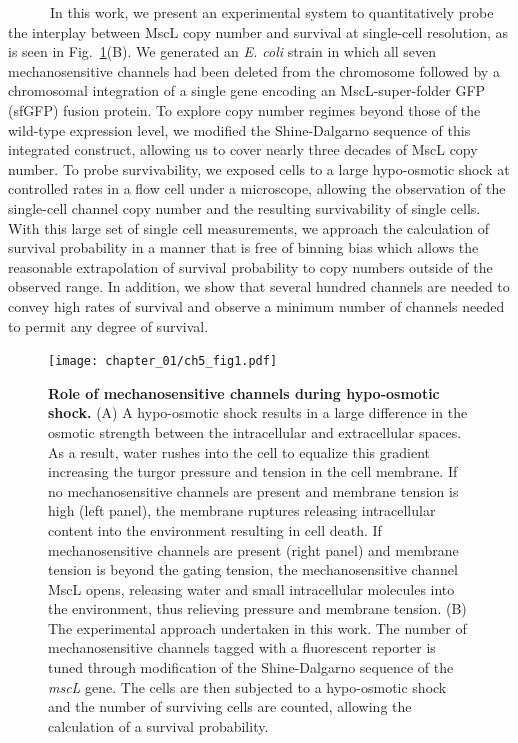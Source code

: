 \documentclass[12pt]{caltech_thesis}
\begin{document}
~ ~ ~ ~In this work, we present an experimental system to quantitatively
probe the interplay between MscL copy number and survival at single-cell
resolution, as is seen in Fig.~\ref{fig:overview}(B). We generated an
\emph{E. coli} strain in which all seven mechanosensitive channels had
been deleted from the chromosome followed by a chromosomal integration
of a single gene encoding an MscL-super-folder GFP (sfGFP) fusion
protein. To explore copy number regimes beyond those of the wild-type
expression level, we modified the Shine-Dalgarno sequence of this
integrated construct, allowing us to cover nearly three decades of MscL
copy number. To probe survivability, we exposed cells to a large
hypo-osmotic shock at controlled rates in a flow cell under a
microscope, allowing the observation of the single-cell channel copy
number and the resulting survivability of single cells. With this large
set of single cell measurements, we approach the calculation of survival
probability in a manner that is free of binning bias which allows the
reasonable extrapolation of survival probability to copy numbers outside
of the observed range. In addition, we show that several hundred
channels are needed to convey high rates of survival and observe a
minimum number of channels needed to permit any degree of survival.

\hypertarget{fig:overview}{%
\begin{figure}
\centering
\texttt{[image: chapter\_01/ch5\_fig1.pdf]}
\caption[{Role of mechanosensitive channels during hypo-osmotic
shock.}]{\textbf{Role of mechanosensitive channels during hypo-osmotic
shock.} (A) A hypo-osmotic shock results in a large difference in the
osmotic strength between the intracellular and extracellular spaces. As
a result, water rushes into the cell to equalize this gradient
increasing the turgor pressure and tension in the cell membrane. If no
mechanosensitive channels are present and membrane tension is high (left
panel), the membrane ruptures releasing intracellular content into the
environment resulting in cell death. If mechanosensitive channels are
present (right panel) and membrane tension is beyond the gating tension,
the mechanosensitive channel MscL opens, releasing water and small
intracellular molecules into the environment, thus relieving pressure
and membrane tension. (B) The experimental approach undertaken in this
work. The number of mechanosensitive channels tagged with a fluorescent
reporter is tuned through modification of the Shine-Dalgarno sequence of
the \emph{mscL} gene. The cells are then subjected to a hypo-osmotic
shock and the number of surviving cells are counted, allowing the
calculation of a survival probability.}
\label{fig:overview}
\end{figure}
}
\end{document}
